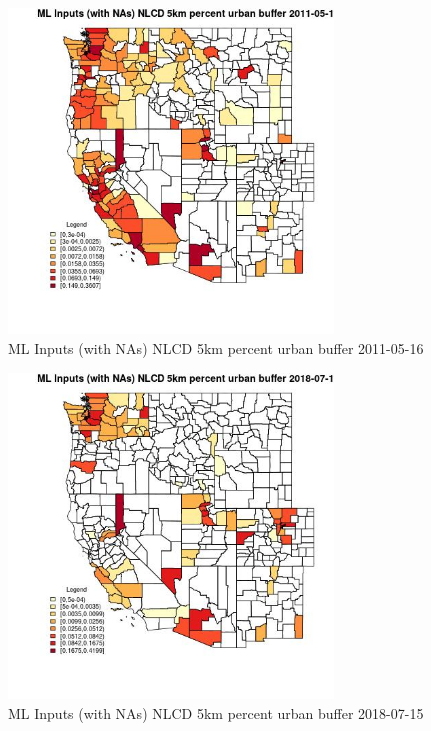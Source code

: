 \begin{figure} 
\centering  
\includegraphics[width=0.77\textwidth]{Code_Outputs/Report_ML_input_PM25_Step4_part_e_de_duplicated_aves_compiled_2019-05-20wNAs_CountyNLCD_5km_percent_urban_bufferMean2011-05-16.jpg} 
\caption{\label{fig:Report_ML_input_PM25_Step4_part_e_de_duplicated_aves_compiled_2019-05-20wNAsCountyNLCD_5km_percent_urban_bufferMean2011-05-16}ML Inputs (with NAs) NLCD 5km percent urban buffer 2011-05-16} 
\end{figure} 
 

\begin{figure} 
\centering  
\includegraphics[width=0.77\textwidth]{Code_Outputs/Report_ML_input_PM25_Step4_part_e_de_duplicated_aves_compiled_2019-05-20wNAs_CountyNLCD_5km_percent_urban_bufferMean2018-07-15.jpg} 
\caption{\label{fig:Report_ML_input_PM25_Step4_part_e_de_duplicated_aves_compiled_2019-05-20wNAsCountyNLCD_5km_percent_urban_bufferMean2018-07-15}ML Inputs (with NAs) NLCD 5km percent urban buffer 2018-07-15} 
\end{figure} 
 

